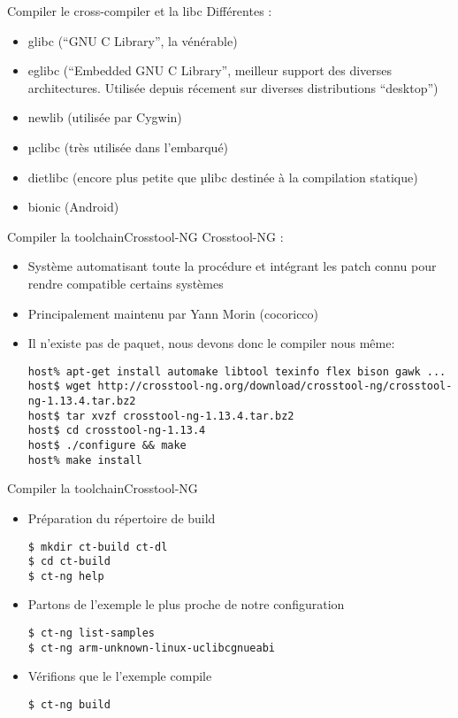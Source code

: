 \begin{frame}[fragile=singleslide]{Compiler le cross-compiler et la libc}
  Différentes :
  \begin{itemize}
  \item glibc (``GNU C Library'', la vénérable)
  \item  eglibc  (``Embedded GNU  C  Library'',  meilleur support  des
    diverses  architectures.  Utilisée  depuis récement  sur  diverses
    distributions ``desktop'')
  \item newlib (utilisée par Cygwin)
  \item µclibc (très utilisée dans l'embarqué)
  \item  dietlibc  (encore  plus   petite  que  µlibc  destinée  à  la
    compilation statique)
  \item bionic (Android)
  \end{itemize}
\end{frame}

\begin{frame}[fragile=singleslide]{Compiler la toolchain}{Crosstool-NG}
  Crosstool-NG :
  \begin{itemize}
  \item Système automatisant toute la procédure et intégrant les patch
    connu pour rendre compatible certains systèmes
  \item Principalement maintenu par Yann Morin (cocoricco)
  \item Il n'existe  pas de paquet, nous devons  donc le compiler nous
    même:
    \begin{lstlisting}
host% apt-get install automake libtool texinfo flex bison gawk ...
host$ wget http://crosstool-ng.org/download/crosstool-ng/crosstool-ng-1.13.4.tar.bz2
host$ tar xvzf crosstool-ng-1.13.4.tar.bz2
host$ cd crosstool-ng-1.13.4
host$ ./configure && make
host% make install
    \end{lstlisting}
  \end{itemize}
\end{frame}

\begin{frame}[fragile=singleslide]{Compiler la toolchain}{Crosstool-NG}
  \begin{itemize}
  \item Préparation du répertoire de build
    \begin{lstlisting}
$ mkdir ct-build ct-dl
$ cd ct-build
$ ct-ng help
    \end{lstlisting}
  \item Partons de l'exemple le plus proche de notre configuration
    \begin{lstlisting}
$ ct-ng list-samples
$ ct-ng arm-unknown-linux-uclibcgnueabi
    \end{lstlisting}
  \item Vérifions que le l'exemple compile
    \begin{lstlisting}
$ ct-ng build
    \end{lstlisting}
  \end{itemize}
\end{frame}

